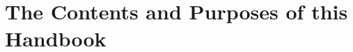 \documentclass[11pt, twoside]{memoir}
\begin{document}
\section{The Contents and Purposes of this Handbook}
%
%
%
\end{document}
